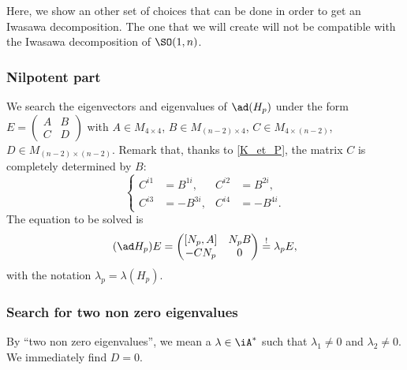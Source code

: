 Here, we show an other set of choices that can be done in order to get an Iwasawa decomposition. The one that we will create will not be compatible with the Iwasawa decomposition of $\SO(1,n)$.

\subsubsection{Nilpotent part}

We search the eigenvectors and eigenvalues of $\ad(H_p)$ under the form $E=\begin{pmatrix}A&B\\C&D\end{pmatrix}$ with $A\in M_{4\times 4}$, $B\in M_{(n-2)\times 4}$, $C\in M_{4\times (n-2)}$, $D\in M_{(n-2)\times (n-2)}$.  Remark that, thanks to \eqref{K_et_P}, the matrix $C$ is completely determined by $B$:
\begin{equation}\label{C_de_B}
	\left\{\begin{aligned}C^{i1} & =B^{1i},  & C^{i2} & =B^{2i},  \\
               C^{i3} & =-B^{3i}, & C^{i4} & =-B^{4i}.\end{aligned}\right.
\end{equation}
The equation to be solved is
\begin{equation}                                                                        \label{eq_gene}
	(\ad H_p)E=\begin{pmatrix}[N_p,A]&N_pB\\-CN_p&0\end{pmatrix}\stackrel{!}{=}\lambda_pE,
\end{equation}
with the notation $\lambda_p=\lambda(H_p)$.


\subsubsection{Search for two non zero eigenvalues}

By ``two non zero eigenvalues'', we mean a $\lambda\in\iA^*$ such that $\lambda_{1}\neq 0$ and $\lambda_{2}\neq 0$. We immediately find $D=0$.

